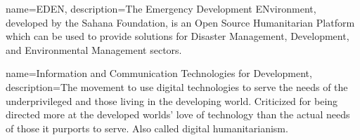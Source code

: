 {
   name=EDEN,
   description={The Emergency Development ENvironment, developed by the Sahana Foundation, is an Open Source Humanitarian Platform which can be used to provide solutions for Disaster Management, Development, and Environmental Management sectors.}
}

{
   name=Information and Communication Technologies for Development,
   description={The movement to use digital technologies to serve the needs of the underprivileged and those living in the developing world. Criticized for being directed more at the developed worlds' love of technology than the actual needs of those it purports to serve. Also called digital humanitarianism.}
}

